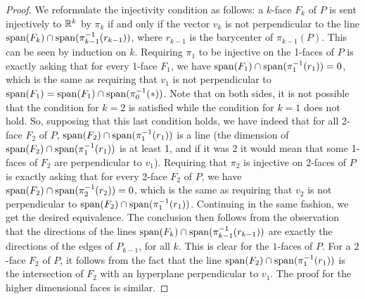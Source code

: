\begin{proof}
	We reformulate the injectivity condition as follows: 
	a $k$-face $F_k$ of $P$ is sent injectively to $\mathbb{R}^k$ by $\pi_k$ if and only if the vector $v_k$ is not perpendicular to the line $\operatorname{\mathrm{span}}(F_k) \cap \operatorname{\mathrm{span}}(\pi_{k-1}^{-1}(r_{k-1}))$, where $r_{k-1}$ is the barycenter of $\pi_{k-1}(P)$.
	This can be seen by induction on $k$. 
	Requiring $\pi_1$ to be injective on the 1-faces of $P$ is exactly asking that for every 1-face $F_1$, we have $\operatorname{\mathrm{span}}(F_1)\cap \operatorname{\mathrm{span}}(\pi_{1}^{-1}(r_{1}))=0$, which is the same as requiring that $v_1$ is not perpendicular to $\operatorname{\mathrm{span}}(F_1)=\operatorname{\mathrm{span}}(F_1)\cap \operatorname{\mathrm{span}}(\pi_{0}^{-1}(*))$.
	Note that on both sides, it is not possible that the condition for $k=2$ is satisfied while the condition for $k=1$ does not hold.
	So, supposing that this last condition holds, we have indeed that for all 2-face $F_2$ of $P$, $\operatorname{\mathrm{span}}(F_2)\cap \operatorname{\mathrm{span}}(\pi_{1}^{-1}(r_{1}))$ is a line (the dimension of $\operatorname{\mathrm{span}}(F_2)\cap \operatorname{\mathrm{span}}(\pi_{1}^{-1}(r_{1}))$ is at least 1, and if it was 2 it would mean that some 1-faces of $F_2$ are perpendicular to $v_1$).
	Requiring that $\pi_2$ is injective on 2-faces of $P$ is exactly asking that for every 2-face $F_2$ of $P$, we have $\operatorname{\mathrm{span}}(F_2)\cap \operatorname{\mathrm{span}}(\pi_{2}^{-1}(r_{2}))=0$, which is the same as requiring that $v_2$ is not perpendicular to $\operatorname{\mathrm{span}}(F_2)\cap \operatorname{\mathrm{span}}(\pi_{1}^{-1}(r_{1}))$.
	Continuing in the same fashion, we get the desired equivalence.
	The conclusion then follows from the observation that the directions of the lines $\operatorname{\mathrm{span}}(F_k) \cap \operatorname{\mathrm{span}}(\pi_{k-1}^{-1}(r_{k-1}))$ are exactly the directions of the edges of $P_{k-1}$, for all $k$. 
	This is clear for the $1$-faces of $P$.
	For a $2$-face $F_2$ of $P$, it follows from the fact that the line $\operatorname{\mathrm{span}}(F_2)\cap \operatorname{\mathrm{span}}(\pi_{1}^{-1}(r_{1}))$ is the intersection of $F_2$ with an hyperplane perpendicular to $v_1$. 
	The proof for the higher dimensional faces is similar.
\end{proof}
